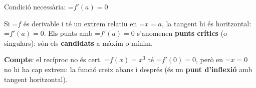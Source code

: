 \documentclass[11pt,a4paper]{article}
\newcommand{\fmm}[1]{\setbox0=\hbox{$#1$}\ifdim\wd0>\linewidth\[#1\]\else\mbox{\box0}\fi}
\newcommand{\fmuline}[1]{\textbf{\color{fmaccent}#1}}
\begin{document}
  
\begin{fmprop}{Condició necessària: \fmm{f'(a)=0}}
\par\noindent \begin{minipage}[t]{0.48\linewidth}\vspace{0pt}\raggedright Si \fmm{f} és derivable i té un extrem relatiu en \fmm{x=a}, la tangent hi és horitzontal: \fmm{f'(a)=0}. Els punts amb \fmm{f'(a)=0} s'anomenen \textbf{punts crítics} (o singulars): són els \textbf{candidats} a màxim o mínim.

          
\begin{fmnote}\fmuline{Compte}: el recíproc no és cert. \fmm{f(x)=x^3} té \fmm{f'(0)=0}, però en \fmm{x=0} no hi ha cap extrem: la funció creix abans i després (és un \textbf{punt d'inflexió} amb tangent horitzontal).\end{fmnote}\end{minipage}\hfill\begin{minipage}[t]{0.48\linewidth}\vspace{0pt}\raggedright \begin{center}\end{center}\end{minipage}\par\medskip
\end{fmprop}
\end{document}
